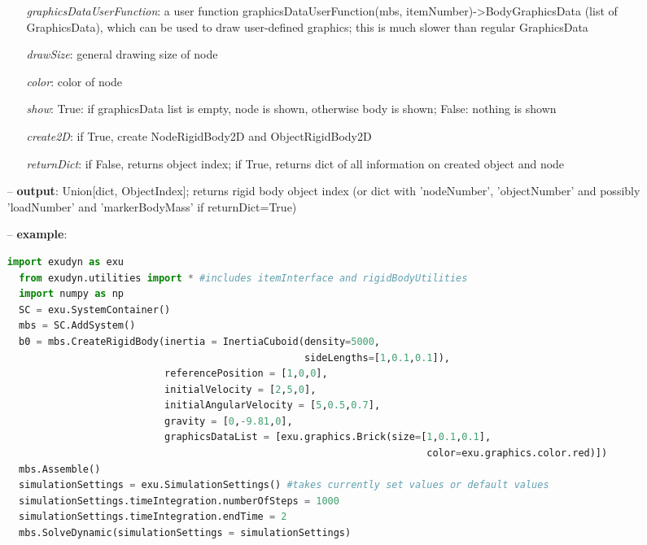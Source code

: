 \begin{itemize}[leftmargin=0.7cm]
\begin{itemize}[leftmargin=1.2cm]
\item[]{\it graphicsDataUserFunction}: a user function graphicsDataUserFunction(mbs, itemNumber)->BodyGraphicsData (list of GraphicsData), which can be used to draw user-defined graphics; this is much slower than regular GraphicsData
\item[]{\it drawSize}: general drawing size of node
\item[]{\it color}: color of node
\item[]{\it show}: True: if graphicsData list is empty, node is shown, otherwise body is shown; False: nothing is shown
\item[]{\it create2D}: if True, create NodeRigidBody2D and ObjectRigidBody2D
\item[]{\it returnDict}: if False, returns object index; if True, returns dict of all information on created object and node
\end{itemize}
\item[--]
{\bf output}: Union[dict, ObjectIndex]; returns rigid body object index (or dict with 'nodeNumber', 'objectNumber' and possibly 'loadNumber' and 'markerBodyMass' if returnDict=True)
\item[--]
{\bf example}: \vspace{-12pt}\ei\begin{lstlisting}[language=Python, xleftmargin=36pt]
  import exudyn as exu
  from exudyn.utilities import * #includes itemInterface and rigidBodyUtilities
  import numpy as np
  SC = exu.SystemContainer()
  mbs = SC.AddSystem()
  b0 = mbs.CreateRigidBody(inertia = InertiaCuboid(density=5000,
                                                   sideLengths=[1,0.1,0.1]),
                           referencePosition = [1,0,0],
                           initialVelocity = [2,5,0],
                           initialAngularVelocity = [5,0.5,0.7],
                           gravity = [0,-9.81,0],
                           graphicsDataList = [exu.graphics.Brick(size=[1,0.1,0.1],
                                                                        color=exu.graphics.color.red)])
  mbs.Assemble()
  simulationSettings = exu.SimulationSettings() #takes currently set values or default values
  simulationSettings.timeIntegration.numberOfSteps = 1000
  simulationSettings.timeIntegration.endTime = 2
  mbs.SolveDynamic(simulationSettings = simulationSettings)
\end{lstlisting}\vspace{-24pt}\bi\item[]\vspace{-24pt}\vspace{12pt}\end{itemize}
%

